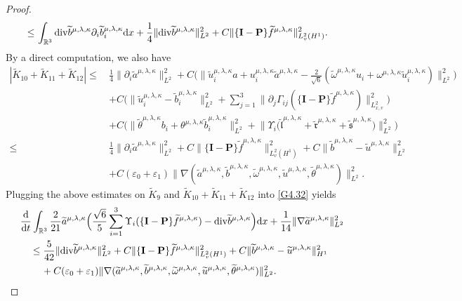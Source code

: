 \documentclass[reqno,11pt]{amsart}
\theoremstyle{plain}
\numberwithin{equation}{section}
\newcommand{\eps}{{\varepsilon}}
\begin{document}
\begin{proof}
\begin{align*}
\leq&\, \int_{\mathbb{R}^3}   {\rm div}   \widetilde{b}^{\mu,\lambda,\kappa}   \partial_i \widetilde{b}^{\mu,\lambda,\kappa}_i \mathrm{d} x+\frac{1}{4} \|  {\rm div}   \widetilde{b}^{\mu,\lambda,\kappa} \|_{L^2}^2+C\|\{\mathbf{I}-\mathbf{P}\} \widetilde{f}^{\mu,\lambda,\kappa}\|_{L_v^2 (H^1 )}^2. 
\end{align*}
By a direct computation, we also have
\begin{align*}
|\widetilde{K}_{10}+\widetilde{K}_{11}+\widetilde{K}_{12}|
\leq \,&\frac{1}{4}\| \partial_i \widetilde{a}^{\mu,\lambda,\kappa}\|_{L^2}^2+C\big(\| \widetilde{u}^{\mu,\lambda,\kappa}_i a+u_i^{\mu,\lambda,\kappa}\widetilde{a}^{\mu,\lambda,\kappa}-\frac{2}{\sqrt{6}} (\widetilde
\omega^{\mu,\lambda,\kappa} u_i+\omega^{\mu,\lambda,\kappa}\widetilde{u}_i^{\mu,\lambda,\kappa})\|_{L^2}^2\big) \\
&+ C\big( \|  \widetilde{u}^{\mu,\lambda,\kappa}_i-\widetilde{b}^{\mu,\lambda,\kappa}_i\|_{L^2}^2+\sum_{j=1}^3 \|  \partial_j \Gamma_{i j}(\{\mathbf{I}-\mathbf{P}\} \widetilde{f}^{\mu,\lambda,\kappa})\|_{L_{x,v}^2}^2\big) \\
&+C\big(\|  \widetilde\theta^{\mu,\lambda,\kappa} b_i+\theta^{\mu,\lambda,\kappa}\widetilde{b}^{\mu,\lambda,\kappa}_i\|_{L^2}^2+\big\|  \Upsilon_i\big(\widetilde{\mathfrak{l}}^{\mu,\lambda,\kappa}+\widetilde{\mathfrak{r}}^{\mu,\lambda,\kappa}+\widetilde{\mathfrak{s}}^{\mu,\lambda,\kappa}\big) \big\|_{L ^2}^2 \big)\\
\leq\, &\frac{1}{4}\|  \partial_i \widetilde{a}^{\mu,\lambda,\kappa} \|_{L^2}^2+C\|\{\mathbf{I}-\mathbf{P}\} \widetilde{f}^{\mu,\lambda,\kappa}\|_{L_v^2 (H^1 )}^2+C\|\widetilde{b}^{\mu,\lambda,\kappa}-\widetilde{u}^{\mu,\lambda,\kappa}\|_{L^2}^2\nonumber\\
& + C(\eps_0+\eps_1)\|\nabla(\widetilde{a}^{\mu,\lambda,\kappa},\widetilde{b}^{\mu,\lambda,\kappa},\widetilde{\omega}^{\mu,\lambda,\kappa},\widetilde{u}^{\mu,\lambda,\kappa},\widetilde{\theta}^{\mu,\lambda,\kappa})\|_{L^2}^2.    
\end{align*}
Plugging the above estimates on $\widetilde{K}_9$ and $\widetilde{K}_{10} + \widetilde{K}_{11}+ \widetilde{K}_{12}$ into \eqref{G4.32} yields
\begin{align}\label{G4.33}
&\frac{\mathrm{d}}{\mathrm{d} t}   \int_{\mathbb{R}^3} \frac{2}{21}   \widetilde{a}^{\mu,\lambda,\kappa}  \Big(\frac{\sqrt{6}}{5}\sum_{i=1}^3 \Upsilon_i(\{\mathbf{I}-\mathbf{P}\} \widetilde{f}^{\mu,\lambda,\kappa})-{\rm div}   \widetilde{b}^{\mu,\lambda,\kappa}\Big) \mathrm{d} x+\frac{1}{14}   \|  \nabla  \widetilde{a}^{\mu,\lambda,\kappa}\|_{L^2}^2\nonumber \\
&\quad \leq \frac{5}{42} \| {\rm div}   \widetilde{b}^{\mu,\lambda,\kappa}\|_{L^2}^2+C\|\{\mathbf{I}-\mathbf{P}\} \widetilde{f}^{\mu,\lambda,\kappa}\|_{L_v^2 (H^1 )}^2+C\|\widetilde{b}^{\mu,\lambda,\kappa}-\widetilde{u}^{\mu,\lambda,\kappa}\|_{H^1}^2\nonumber\\
&\quad\quad\, +C(\eps_0+\eps_1)\|\nabla(\widetilde{a}^{\mu,\lambda,\kappa},\widetilde{b}^{\mu,\lambda,\kappa},\widetilde{\omega}^{\mu,\lambda,\kappa},\widetilde{u}^{\mu,\lambda,\kappa},\widetilde{\theta}^{\mu,\lambda,\kappa})\|_{L^2}^2.
\end{align}


\end{proof}
\end{document}
